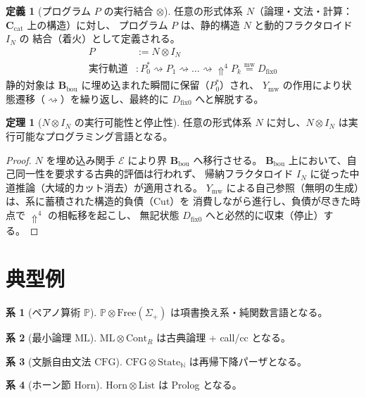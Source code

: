 \documentclass[11pt,a4paper]{article}
\theoremstyle{definition}
\newtheorem{definition}{定義}[section]
\newtheorem{theorem}{定理}[section]
\newtheorem{corollary}{系}[section]
\newcommand{\dfix}{D_{\mathrm{fix}0}} %
\newcommand{\mweq}{\mathrel{\overset{\mathrm{mw}}{=}}}
\newcommand{\metanegation}{\Uparrow}
\newcommand{\Cat}{\mathbf{C}_{\mathrm{cat}}}  %
\newcommand{\Bou}{\mathbf{B}_{\mathrm{bou}}}  %
\newcommand{\Leadsto}{\rightsquigarrow}
\newcommand{\susp}[1]{#1^*}
\newcommand{\Rmw}{Y_{\mathrm{mw}}}
\begin{document}
\begin{definition}[プログラム $P$ の実行結合 $\otimes$]
任意の形式体系 $N$（論理・文法・計算：$\Cat$ 上の構造）に対し、
プログラム $P$ は、静的構造 $N$ と動的フラクタロイド $I_N$ の
結合（着火）として定義される。
\begin{align*}
P &:= N \otimes I_N \\
\text{実行軌道} &: \susp{P_0} \Leadsto P_1 \Leadsto \dots \Leadsto \metanegation^4 P_k \mweq \dfix
\end{align*}
静的対象は $\Bou$ に埋め込まれた瞬間に保留（$\susp{P_0}$）され、
$\Rmw$ の作用により状態遷移（$\Leadsto$）を繰り返し、最終的に $\dfix$ へと解脱する。
\end{definition}

\begin{theorem}[$N \otimes I_N$ の実行可能性と停止性]
任意の形式体系 $N$ に対し、$N \otimes I_N$ は実行可能なプログラミング言語となる。
\end{theorem}
\begin{proof}
$N$ を埋め込み関手 $\mathcal{E}$ により界 $\Bou$ へ移行させる。
$\Bou$ 上において、自己同一性を要求する古典的評価は行われず、
帰納フラクタロイド $I_N$ に従った中道推論（大域的カット消去）が適用される。
$\Rmw$ による自己参照（無明の生成）は、系に蓄積された構造的負債（Cut）を
消費しながら進行し、負債が尽きた時点で $\metanegation^4$ の相転移を起こし、
無記状態 $\dfix$ へと必然的に収束（停止）する。
\end{proof}

\section{典型例}

\begin{corollary}[ペアノ算術 $\mathbb{P}$]
$\mathbb{P} \otimes \text{Free}(\Sigma_+)$ は項書換え系・純関数言語となる。
\end{corollary}

\begin{corollary}[最小論理 $\mathrm{ML}$]
$\mathrm{ML} \otimes \text{Cont}_R$ は古典論理 + call/cc となる。
\end{corollary}

\begin{corollary}[文脈自由文法 $\mathrm{CFG}$]
$\mathrm{CFG} \otimes \text{State}_{\mathbb{N}}$ は再帰下降パーザとなる。
\end{corollary}

\begin{corollary}[ホーン節 $\mathrm{Horn}$]
$\mathrm{Horn} \otimes \text{List}$ は Prolog となる。
\end{corollary}
\end{document}
